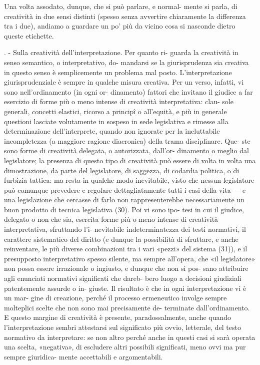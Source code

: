 Una volta  assodato, dunque,  che  si può  parlare, e  normal-
mente si parla, di creatività in due sensi distinti (spesso senza 
avvertire  chiaramente  la  differenza  tra  i  due),  andiamo  a 
guardare un po’ più da vicino cosa si nasconde dietro queste 
etichette.

.  -  Sulla  creatività  dell’interpretazione.  Per  quanto  ri-
guarda  la  creatività  in  senso  semantico,  o  interpretativo,  do-
mandarsi  se  la  giurisprudenza  sia  creativa  in  questo  senso  è 
semplicemente un problema mal posto. L’interpretazione 
giurisprudenziale è sempre in qualche misura creativa.  
Per un verso, infatti, vi sono nell’ordinamento (in ogni or-
dinamento)  fattori  che  invitano  il  giudice  a  far  esercizio  di 
forme  più  o  meno  intense  di  creatività  interpretativa:  clau-
sole generali, concetti elastici, ricorso a principî o all’equità, 
e più in generale questioni lasciate volutamente in sospeso in 
sede legislativa e rimesse alla determinazione dell’interprete, 
quando  non  ignorate  per  la  ineluttabile  incompletezza  (a 
maggiore  ragione  diacronica)  della  trama  disciplinare.  Que-
ste  sono  forme  di  creatività  delegata,  o  autorizzata,  dall’or-
dinamento o meglio dal legislatore; la presenza di questo tipo 
di  creatività  può  essere  di  volta  in  volta  una  dimostrazione, 
da parte del legislatore, di saggezza, di codardia politica, o di 
furbizia  tattica:  ma  resta  in  qualche  modo  inevitabile,  visto 
che  nessun  legislatore  può  comunque  prevedere  e  regolare dettagliatamente  tutti  i  casi  della  vita  —  e  una  legislazione 
che  cercasse  di  farlo  non  rappresenterebbe  necessariamente 
un buon prodotto di tecnica legislativa (30). Poi vi sono ipo-
tesi  in  cui  il  giudice,  delegato  o  non  che  sia,  esercita  forme 
più o meno intense di creatività interpretativa, sfruttando l’i-
nevitabile  indeterminatezza  dei  testi  normativi,  il  carattere 
sistematico  del  diritto  (e  dunque  la  possibilità  di  sfruttare,  e 
anche  reinventare,  le  più  diverse  combinazioni  tra  i  vari 
«pezzi»  del  sistema  (31)),  e  il  presupposto  interpretativo 
spesso  silente,  ma  sempre  all’opera,  che  «il  legislatore»  non 
possa essere irrazionale o ingiusto, e dunque che non si pos-
sano attribuire agli enunciati normativi significati che dareb-
bero  luogo  a  decisioni  giudiziali  patentemente  assurde  o  in-
giuste.  Il  risultato  è  che  in ogni  interpretazione vi  è  un mar-
gine  di  creazione,  perché  il  processo  ermeneutico  involge 
sempre  molteplici  scelte  che non  sono  mai  precisamente de-
terminate dall’ordinamento. E  questo  margine di  creatività  è 
presente,  paradossalmente,  anche  quando  l’interpretazione 
sembri attestarsi sul significato più ovvio, letterale, del testo 
normativo da interpretare: se non altro perché anche in questi 
casi  si  sarà  operata  una  scelta,  «negativa»,  di  escludere  altri 
possibili  significati,  meno  ovvi  ma  pur  sempre  giuridica-
mente accettabili e argomentabili.  

